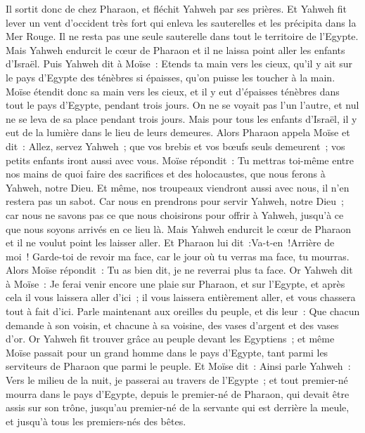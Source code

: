 \begin{multicols}{2}
Il sortit donc de chez Pharaon, et fléchit Yahweh par ses prières.
Et Yahweh fit lever un vent d'occident très fort qui enleva les sauterelles et les précipita dans la Mer Rouge. Il ne resta pas une seule sauterelle dans tout le territoire de l'Egypte.
Mais Yahweh endurcit le cœur de Pharaon et il ne laissa point aller les enfants d'Israël.
Puis Yahweh dit à Moïse~: Etends ta main vers les cieux, qu'il y ait sur le pays d'Egypte des ténèbres si épaisses, qu'on puisse les toucher à la main.
Moïse étendit donc sa main vers les cieux, et il y eut d'épaisses ténèbres dans tout le pays d'Egypte, pendant trois jours.
On ne se voyait pas l'un l'autre, et nul ne se leva de sa place pendant trois jours. Mais pour tous les enfants d'Israël, il y eut de la lumière dans le lieu de leurs demeures.
Alors Pharaon appela Moïse et dit~: Allez, servez Yahweh~; que vos brebis et vos bœufs seuls demeurent~; vos petits enfants iront aussi avec vous.
Moïse répondit~: Tu mettras toi-même entre nos mains de quoi faire des sacrifices et des holocaustes, que nous ferons à Yahweh, notre Dieu.
Et même, nos troupeaux viendront aussi avec nous, il n'en restera pas un sabot. Car nous en prendrons pour servir Yahweh, notre Dieu~; car nous ne savons pas ce que nous choisirons pour offrir à Yahweh, jusqu'à ce que nous soyons arrivés en ce lieu là.
Mais Yahweh endurcit le cœur de Pharaon et il ne voulut point les laisser aller.
Et Pharaon lui dit~:Va-t-en~!Arrière de moi~! Garde-toi de revoir ma face, car le jour où tu verras ma face, tu mourras.
Alors Moïse répondit~: Tu as bien dit, je ne reverrai plus ta face.
\VerseOne{}Or Yahweh dit à Moïse~: Je ferai venir encore une plaie sur Pharaon, et sur l'Egypte, et après cela il vous laissera aller d'ici~; il vous laissera entièrement aller, et vous chassera tout à fait d'ici.
Parle maintenant aux oreilles du peuple, et dis leur~: Que chacun demande à son voisin, et chacune à sa voisine, des vases d'argent et des vases d'or.
Or Yahweh fit trouver grâce au peuple devant les Egyptiens~; et même Moïse passait pour un grand homme dans le pays d'Egypte, tant parmi les serviteurs de Pharaon que parmi le peuple.
Et Moïse dit~: Ainsi parle Yahweh~: Vers le milieu de la nuit, je passerai au travers de l'Egypte~;
et tout premier-né mourra dans le pays d'Egypte, depuis le premier-né de Pharaon, qui devait être assis sur son trône, jusqu'au premier-né de la servante qui est derrière la meule, et jusqu'à tous les premiers-nés des bêtes.

\end{multicols}
